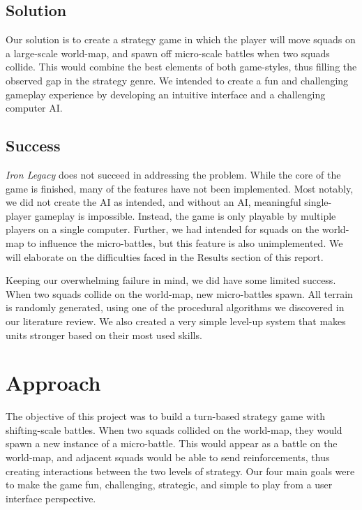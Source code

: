 \documentclass{article}
\begin{document}
\subsection*{Solution}
Our solution is to create a strategy game in which the player will move squads
on a large-scale world-map, and spawn off micro-scale battles when two squads
collide.
This would combine the best elements of both game-styles,
thus filling the observed gap in the strategy genre.
We intended to create a fun and challenging gameplay experience by developing
an intuitive interface and a challenging computer AI.

\subsection*{Success}
\emph{Iron Legacy} does not succeed in addressing the problem.
While the core of the game is finished, many of the features have not been
implemented.
Most notably, we did not create the AI as intended,
and without an AI, meaningful single-player gameplay is impossible.
Instead, the game is only playable by multiple players on a single computer.
Further, we had intended for squads on the world-map to influence
the micro-battles, but this feature is also unimplemented.
We will elaborate on the difficulties faced in the Results section of this
report.

Keeping our overwhelming failure in mind, we did have some limited success.
When two squads collide on the world-map, new micro-battles spawn.
All terrain is randomly generated, using one of the procedural algorithms
we discovered in our literature review.
We also created a very simple level-up system that makes units stronger
based on their most used skills.

\section*{Approach}
The objective of this project was to build a turn-based strategy game with 
shifting-scale battles.
When two squads collided on the world-map, they would spawn a new instance of
a micro-battle.
This would appear as a battle on the world-map, and adjacent squads would be
able to send reinforcements, thus creating interactions between the two
levels of strategy.
Our four main goals were to make the game fun, challenging, strategic, and 
simple to play from a user interface perspective.
\end{document}
